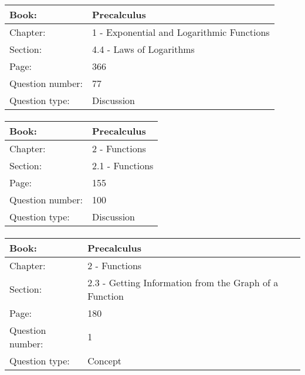 \documentclass{article}
\begin{document}
   \paragraph{}
   \begin{tabularx}{1\textwidth}{
           p{}
           p{}
       }
       \toprule
       Book: & Precalculus
       \\
       \midrule
       Chapter: & 1 - Exponential and Logarithmic Functions
       \\
       \midrule
       Section: & 4.4 - Laws of Logarithms
       \\
       \midrule
       Page: & 366
       \\
       \midrule
       Question number: & 77
       \\
       \midrule
       Question type: & Discussion
       \\
       \bottomrule
   \end{tabularx}



   \paragraph{}
   \begin{tabularx}{1\textwidth}{
           p{}
           p{}
       }
       \toprule
       Book: & Precalculus
       \\
       \midrule
       Chapter: & 2 - Functions
       \\
       \midrule
       Section: & 2.1 - Functions
       \\
       \midrule
       Page: & 155
       \\
       \midrule
       Question number: & 100
       \\
       \midrule
       Question type: & Discussion
       \\
       \bottomrule
   \end{tabularx}



   \paragraph{}
   \begin{tabularx}{1\textwidth}{
           p{}
           p{}
       }
       \toprule
       Book: & Precalculus
       \\
       \midrule
       Chapter: & 2 - Functions
       \\
       \midrule
       Section: & 2.3 - Getting Information from the Graph of a Function
       \\
       \midrule
       Page: & 180
       \\
       \midrule
       Question number: & 1
       \\
       \midrule
       Question type: & Concept
       \\
       \bottomrule
   \end{tabularx}
\end{document}
